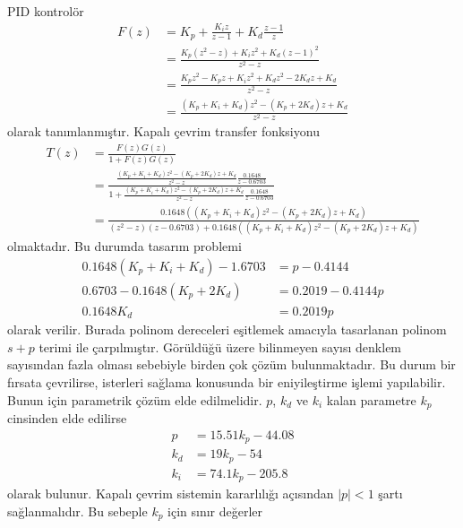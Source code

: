 PID kontrolör
\begin{equation}
\begin{split}
    F(z)&=K_p+\frac{K_iz}{z-1}+K_d\frac{z-1}{z}\\
    &=\frac{K_p(z^2-z)+K_iz^2+K_d(z-1)^2}{z^2-z}\\
    &=\frac{K_pz^2-K_pz+K_iz^2+K_dz^2-2K_dz+K_d}{z^2-z}\\
    &=\frac{(K_p+K_i+K_d)z^2-(K_p+2K_d)z+K_d}{z^2-z}
\end{split}
\end{equation}
olarak tanımlanmıştır. Kapalı çevrim transfer fonksiyonu
\begin{equation}
    \begin{split}
        T(z)&=\frac{F(z)G(z)}{1+F(z)G(z)}\\
        &=\frac{\frac{(K_p+K_i+K_d)z^2-(K_p+2K_d)z+K_d}{z^2-z}\frac{0.1648}{z-0.6703}}{1+\frac{(K_p+K_i+K_d)z^2-(K_p+2K_d)z+K_d}{z^2-z}\frac{0.1648}{z-0.6703}}\\
        &=\frac{0.1648((K_p+K_i+K_d)z^2-(K_p+2K_d)z+K_d)}{(z^2-z)(z-0.6703)+0.1648((K_p+K_i+K_d)z^2-(K_p+2K_d)z+K_d)}
    \end{split}
\end{equation}
olmaktadır. Bu durumda tasarım problemi
\begin{equation}
    \begin{split}
        0.1648(K_p+K_i+K_d)-1.6703&= p- 0.4144\\
        0.6703-0.1648(K_p+2K_d)&=0.2019 - 0.4144p\\
        0.1648K_d&=0.2019p
    \end{split}
\end{equation}
olarak verilir. Burada polinom dereceleri eşitlemek amacıyla tasarlanan polinom $s+p$ terimi ile çarpılmıştır. Görüldüğü üzere bilinmeyen sayısı denklem sayısından fazla olması sebebiyle birden çok çözüm bulunmaktadır. Bu durum bir fırsata çevrilirse, isterleri sağlama konusunda bir eniyileştirme işlemi yapılabilir. Bunun için parametrik çözüm elde edilmelidir. $p$, $k_d$ ve $k_i$ kalan parametre $k_p$ cinsinden elde edilirse 
\begin{equation}
    \begin{split}
        p&=15.51k_p-44.08\\
        k_d&=19k_p-54\\
        k_i&=74.1k_p-205.8
    \end{split}
\end{equation}
olarak bulunur. Kapalı çevrim sistemin kararlılığı açısından $|p|<1$ şartı sağlanmalıdır. Bu sebeple $k_p$ için sınır değerler
